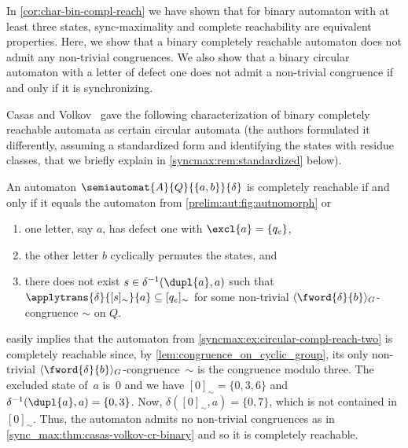 
In \cref{cor:char-bin-compl-reach} 
we have shown that for binary automaton with at least three states,
sync-maximality and complete reachability are equivalent properties.
Here, we show that a binary completely reachable automaton does not admit
any non-trivial congruences. We also show that a binary circular automaton
with a letter of defect one does not admit a non-trivial congruence if and only if
it is synchronizing.

Casas and Volkov~\cite[Thm.~2]{DBLP:conf/latin/CasasV22}
gave the following characterization
of binary completely reachable automata as certain circular automata 
(the authors formulated it differently, assuming a standardized form and identifying
the states with residue classes, that we briefly explain in \cref{syncmax:rem:standardized} below).

\begin{theorem}
	\label{sync_max:thm:casas-volkov-cr-binary}
	An automaton $\semiautomat{A}{Q}{\{a,b\}}{\delta}$ is completely reachable
	if and only if it equals the automaton from \cref{prelim:aut:fig:autnomorph} or
	\begin{enumerate}
		\item one letter, say $a$, has defect one with $\excl{a} = \{q_e\}$,
		
		\item the other letter $b$ cyclically permutes the states, and
		
		\item there does not exist $s \in \delta^{-1}(\dupl{a}, a)$ such that 
		$\applytrans{\delta}{[s]_{\sim}}{a} \subseteq [q_e]_{\sim}$
		for some non-trivial $\langle \fword{\delta}{b} \rangle_G$-congruence $\sim$ on $Q$.
	\end{enumerate}
\end{theorem}

\begin{remark}
	 easily implies that the automaton
	from \cref{syncmax:ex:circular-compl-reach-two} is completely reachable
	since,  by \cref{lem:congruence_on_cyclic_group},
	its only non-trivial $\langle \fword{\delta}{b} \rangle_G$-congruence~$\sim$
	is the congruence modulo three.
	The excluded state of~$a$ is~$0$ and we have $[0]_{\sim} = \{0,3,6\}$
	and $\delta^{-1}(\dupl{a}, a) = \{0,3\}$.
	Now, $\delta([0]_{\sim}, a) = \{0,7\}$, which is not contained in $[0]_{\sim}$.
	Thus, the automaton admits no non-trivial congruences as in \cref{sync_max:thm:casas-volkov-cr-binary}
	and so it is completely reachable.	 
\end{remark}

